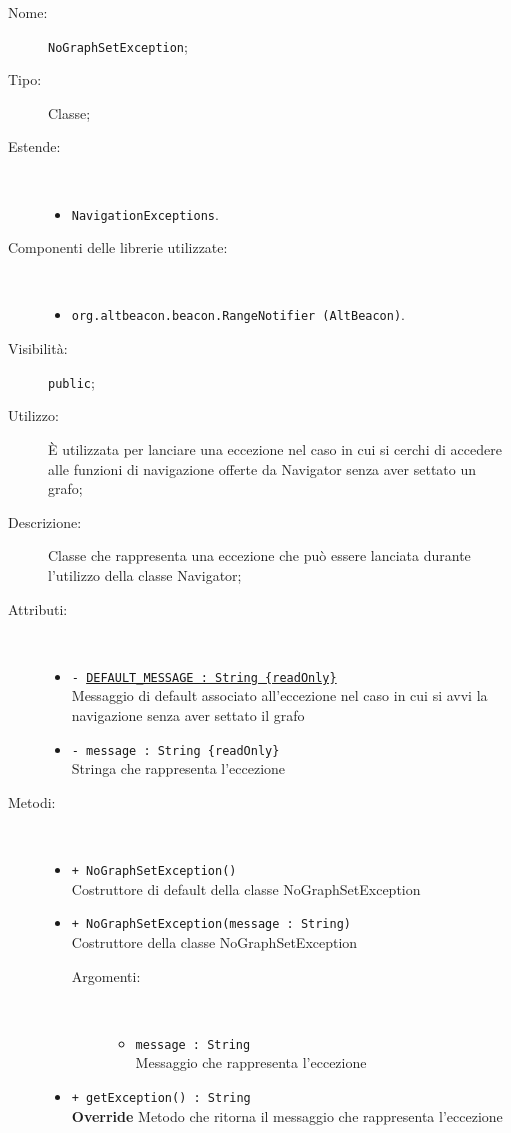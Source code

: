 \documentclass[../DefinizioneDiProdotto.tex]{subfiles}
\begin{document}
\begin{description}
	\item[Nome:] \texttt{NoGraphSetException};
	\item[Tipo:] Classe;
	\item[Estende:] \
	\begin{itemize}
		\item \texttt{NavigationExceptions}.
	\end{itemize}
	\item[Componenti delle librerie utilizzate:] \
	\begin{itemize}
		\item \texttt{org.altbeacon.beacon.RangeNotifier (AltBeacon)}.
		
	\end{itemize}
	\item[Visibilità:] \texttt{public};
	\item[Utilizzo:] È utilizzata per lanciare una eccezione nel caso in cui si cerchi di accedere alle funzioni di navigazione offerte da Navigator senza aver settato un grafo;
	\item[Descrizione:] Classe che rappresenta una eccezione che può essere lanciata durante l'utilizzo della classe Navigator;
	\item[Attributi:] \
	\begin{itemize}
		\item \texttt{- \underline{DEFAULT\_MESSAGE : String \{readOnly\}}}\\
		Messaggio di default associato all'eccezione nel caso in cui si avvi la navigazione senza aver settato il grafo
		
		\item \texttt{- message : String \{readOnly\}}\\
		Stringa che rappresenta l'eccezione
		
	\end{itemize}
	\item[Metodi:] \
	\begin{itemize}
		\item \texttt{+ NoGraphSetException()}\\
		Costruttore di default della classe NoGraphSetException
		\item \texttt{+ NoGraphSetException(message : String)}\\
		Costruttore della classe NoGraphSetException
		\begin{description}
			\item[Argomenti:] \
			\begin{itemize}
				\item \texttt{message : String}\\
				Messaggio che rappresenta l'eccezione\end{itemize}
		\end{description}
		\item \texttt{+ getException() : String}\\
		\textbf{Override} Metodo che ritorna il messaggio che rappresenta l'eccezione
	\end{itemize}
\end{description}
\end{document}
